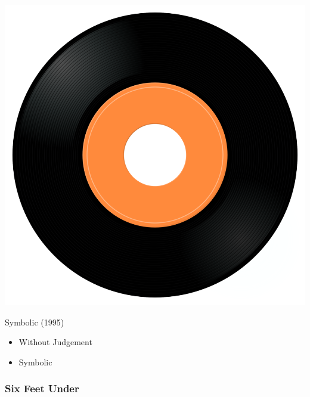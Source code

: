 \begin{minipage}[t]{0.25\textwidth}\vspace{0pt}
\captionsetup{type=figure}
\includegraphics[width=\textwidth]{Images/cover.png}
\caption*{Symbolic (1995)}
\end{minipage}
\begin{minipage}[t]{0.25\textwidth}\vspace{0pt}
\begin{itemize}[nosep,leftmargin=1em,labelwidth=*,align=left]
	\setlength{\itemsep}{0pt}
	\item Without Judgement
	\item Symbolic
\end{itemize}
\end{minipage}

\subsubsection{Six Feet Under}

